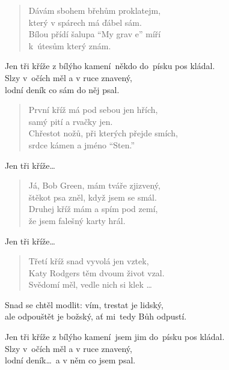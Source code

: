 \begin{song}{}
\begin{verse}
   Dávám sbohem břehům proklatejm, \\
   který v spárech má ďábel sám. \\
   Bílou přídí šalupa \enquote{My grav e} míří \\
   k~útesům který znám.
\end{verse}
\begin{refren}
   Jen tři kříže z bílýho kamení~někdo do~písku pos kládal. \\
   Slzy v~očích měl a v ruce znavený, \\
   lodní deník co sám do něj psal.
\end{refren}
\begin{verse}
   První kříž má pod sebou jen hřích, \\
   samý pití a rvačky jen. \\
   Chřestot nožů, při kterých přejde smích, \\
   srdce kámen a jméno \enquote{Sten.}
\end{verse}
\begin{refren}
   Jen tři kříže\ldots
\end{refren}
\begin{verse}
   Já, Bob Green, mám tváře zjizvený, \\
   štěkot psa zněl, když jsem se smál. \\
   Druhej kříž mám a spím pod zemí, \\
   že jsem falešný karty hrál.
\end{verse}
\begin{refren}
   Jen tři kříže\ldots
\end{refren}
\begin{verse}
   Třetí kříž snad vyvolá jen vztek, \\
   Katy Rodgers těm dvoum život vzal. \\
   Svědomí měl, vedle nich si klek \ldots
\end{verse}
\begin{deco}
   Snad se chtěl modlit: vím, trestat je lidský, \\
   ale odpouštět je božský, ať mi~tedy Bůh odpustí.~       ~ 
\end{deco}
\begin{refren}
   Jen tři kříže z bílýho kamení~jsem jim do~písku pos kládal. \\
   Slzy v~očích měl a v ruce znavený, \\
   lodní deník\ldots ~a v něm co jsem psal.  ~
\end{refren}
\end{song}
\pagebreak

